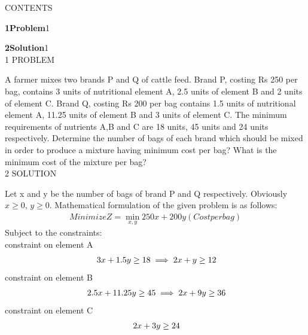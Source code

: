 \documentclass[a4paper,10pt]{report}
\begin{document}
\begin{multicols}{2}
\centering \large\textsc{C}\footnotesize\textsc{ONTENTS}\vspace{5mm}\\
\raggedright\large\textbf{1\hspace{1cm}Problem}\hspace{5.2cm}1\vspace{5mm}\\
\raggedright\large\textbf{2\hspace{1cm}Solution}\hspace{5.25cm}1\vspace{5mm}\\
\centering \large\textsc{1  P}\footnotesize\textsc{ROBLEM}\vspace{5mm}\\
\raggedright\large{A farmer mixes two brands P and Q of cattle feed. Brand P, costing Rs 250 per bag, contains 3 units of nutritional element A, 2.5 units of element B and 2 units of element C. Brand Q, costing Rs 200 per bag contains 1.5 units of nutritional element A, 11.25 units of element B and 3 units of element C. The minimum requirements of nutrients A,B and C are 18 units, 45 units and 24 units respectively. Determine the number of bags of each brand which should be mixed in order to produce a mixture having minimum cost per bag? What is the minimum cost of the mixture per bag?}\vspace{5mm}\\

\centering \large\textsc{2  S}\footnotesize\textsc{OLUTION}\vspace{5mm}\\
\raggedright\large{Let x and y be the number of bags of brand P and Q respectively. Obviously $x\ge0$, $y\ge0$. Mathematical formulation of the given problem is as follows:}\\
\begin{align}
Minimize Z = \min_{x,y}250x+200y (Cost per bag)
\end{align}
Subject to the constraints:\\
constraint on element A
\begin{gather}
\hspace{1mm}3x+1.5y \ge 18  \implies{2x+y \ge 12}
\end{gather}
constraint on element B
\begin{gather}
\hspace{1mm}2.5x+11.25y \ge 45  \implies{2x+9y \ge 36}
\end{gather}
constraint on element C
\begin{gather}
\hspace{1mm}2x+3y \ge 24
\end{gather}


\end{multicols}
\end{document}
